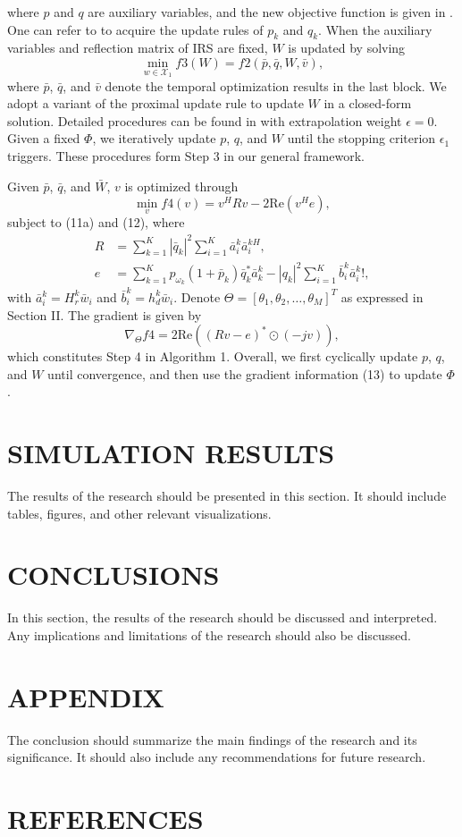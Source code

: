 \documentclass[review]{elsarticle}
\begin{document}
		where $p$ and $q$ are auxiliary variables, and the new objective function is given in \cite{ref9}. One can refer to \cite{ref9, Eq. (11)-(12)} to acquire the update rules of $p_k$ and $q_k$. When the auxiliary variables and reflection matrix of IRS are fixed, $W$ is updated by solving
		\[
		\min_{w \in \mathcal{X}_1} f3(W) = f2(\bar{p}, \bar{q}, W, \bar{v}),
		\]
		where $\bar{p}$, $\bar{q}$, and $\bar{v}$ denote the temporal optimization results in the last block. We adopt a variant of the proximal update rule to update $W$ in a closed-form solution. Detailed procedures can be found in \cite{ref9, Eq. (13)-(14)} with extrapolation weight $\epsilon = 0$. Given a fixed $\Phi$, we iteratively update $p$, $q$, and $W$ until the stopping criterion $\epsilon_1$ triggers. These procedures form Step 3 in our general framework.
		
		Given $\bar{p}$, $\bar{q}$, and $\bar{W}$, $v$ is optimized through
		\[
		\min_v f4(v) = v^H Rv - 2\mathrm{Re} \left( v^H e \right),
		\]
		subject to (11a) and (12), where
		\begin{align*}
			R &= \sum_{k=1}^K \left| \bar{q}_k \right|^2 \sum_{i=1}^K \bar{a}_i^k \bar{a}_i^{kH}, \\
			e &= \sum_{k=1}^K p_{\omega_k} (1 + \bar{p}_k) \bar{q}_k^* \bar{a}_k^k - \left| q_k \right|^2 \sum_{i=1}^K \bar{b}_i^k \bar{a}_i^k!,
		\end{align*}
		with $\bar{a}_i^k = H_r^k \bar{w}_i$ and $\bar{b}_i^k = h_d^k \bar{w}_i$. Denote $\Theta = [\theta_1, \theta_2, \ldots, \theta_M]^T$ as expressed in Section II. The gradient is given by
		\[
		\nabla_{\Theta} f4 = 2\mathrm{Re} \left( (Rv - e)^* \odot (-jv) \right),
		\]
		which constitutes Step 4 in Algorithm 1. Overall, we first cyclically update $p$, $q$, and $W$ until convergence, and then use the gradient information (13) to update $\Phi$.
		
	\section{SIMULATION RESULTS}
	
	The results of the research should be presented in this section. It should include tables, figures, and other relevant visualizations.
	
	\section{CONCLUSIONS}
	
	In this section, the results of the research should be discussed and interpreted. Any implications and limitations of the research should also be discussed.
	
	\section{APPENDIX}
	
	The conclusion should summarize the main findings of the research and its significance. It should also include any recommendations for future research.
	
	\section*{REFERENCES}
	
	
	
\end{document}
